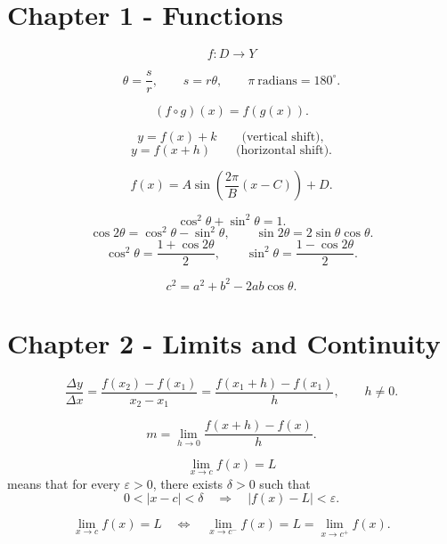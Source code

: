 
\section*{Chapter 1 - Functions}

\[
  f:D\to Y
\]

\[
  \theta=\frac{s}{r},
  \qquad
  s=r\theta,
  \qquad
  \pi\ \text{radians}=180^\circ.
\]

\[
  (f\circ g)(x)=f(g(x)).
\]

\[
  y=f(x)+k
  \qquad\text{(vertical shift)},
\]
\[
  y=f(x+h)
  \qquad\text{(horizontal shift)}.
\]

\[
  f(x)=A\sin\!\left(\frac{2\pi}{B}(x-C)\right)+D.
\]

\[
  \cos^2\theta+\sin^2\theta=1.
\]
\[
  \cos 2\theta=\cos^2\theta-\sin^2\theta,
  \qquad
  \sin 2\theta=2\sin\theta\cos\theta.
\]
\[
  \cos^2\theta=\frac{1+\cos 2\theta}{2},
  \qquad
  \sin^2\theta=\frac{1-\cos 2\theta}{2}.
\]

\[
  c^2=a^2+b^2-2ab\cos\theta.
\]

\section*{Chapter 2 - Limits and Continuity}

\[
  \frac{\Delta y}{\Delta x}
  =
  \frac{f(x_2)-f(x_1)}{x_2-x_1}
  =
  \frac{f(x_1+h)-f(x_1)}{h},
  \qquad h\ne0.
\]

\[
  m=\lim_{h\to0}\frac{f(x+h)-f(x)}{h}.
\]

\[
  \lim_{x\to c}f(x)=L
\]
means that for every \(\varepsilon>0\), there exists \(\delta>0\) such that
\[
  0<|x-c|<\delta
  \quad\Longrightarrow\quad
  |f(x)-L|<\varepsilon.
\]

\[
  \lim_{x\to c}f(x)=L
  \quad\Longleftrightarrow\quad
  \lim_{x\to c^-}f(x)=L
  =
  \lim_{x\to c^+}f(x).
\]

